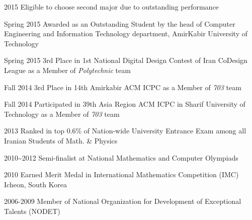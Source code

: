 \documentclass[]{friggeri-cv} %
\begin{document}
\begin{entrylist}


\entry
{2015}
{{\normalfont Eligible to choose} \textcolor{TextGreen}{second major} {\normalfont due to outstanding performance}}
{}
{}


\entry
{Spring 2015}
{\normalfont Awarded as an Outstanding Student by the head of Computer Engineering and Information Technology department, AmirKabir University of Technology}
{}
{}


\entry
{Spring 2015}
{\textcolor{TextYellow}{3rd} {\normalfont Place in 1st National Digital Design Contest of Iran CoDesign League as a Member of \emph{Polytechnic} team}}
{}
{}


\entry
{Fall 2014}
{\textcolor{UniBlue}{3rd} {\normalfont Place in 14th Amirkabir ACM ICPC as a Member of \emph{703} team}}
{}
{}


\entry
{Fall 2014}
{\normalfont Participated in 39th Asia Region ACM ICPC in Sharif University of Technology as a Member of \emph{703} team}
{}
{}


\entry
{2013}
{\normalfont Ranked in top 0.6\% of Nation-wide University Entrance Exam among all Iranian Students of Math. \& Physics}
{}
{}


\entry
{2010\textasciitilde 2012}
{\textcolor{TextOrange}{Semi-finalist} {\normalfont at National Mathematics and Computer Olympiads}}
{}
{}


\entry
{2010}
{{\normalfont Earned} \textcolor{Ocean}{Merit Medal} {\normalfont in International Mathematics Competition (IMC) Icheon, South Korea}}
{}
{}


\entry
{2006-2009}
{\normalfont Member of National Organization for Development of Exceptional Talents (NODET)}
{}
{}


\end{entrylist}
\end{document}
